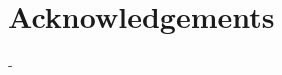 \chapter{Acknowledgements}

-

\iffalse

GRAL and especially Anne-Mathilde Thierry

Jury members

Irina and Joanna

MICA people + adopted (alessio and paco)

Leandro

Alister

napari community, especially juan kevin and grzegorz

family for letting me do stuff

partners

friends

\fi

